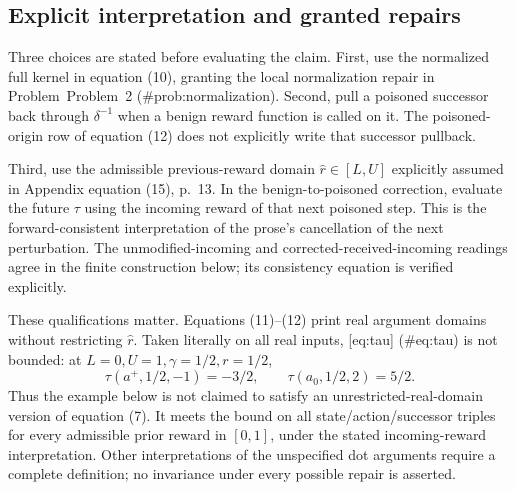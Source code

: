 \documentclass[10pt]{article}
\begin{document}
\subsection*{Explicit interpretation and granted repairs}
Three choices are stated before evaluating the claim. First, use the normalized full kernel in equation (10), granting the local normalization repair in Problem Problem 2 (\#prob:normalization). Second, pull a poisoned successor back through \(\delta^{-1}\) when a benign reward function is called on it. The poisoned-origin row of equation (12) does not explicitly write that successor pullback.\par
Third, use the admissible previous-reward domain \(\widehat r\in[L,U]\) explicitly assumed in Appendix equation (15), p. 13. In the benign-to-poisoned correction, evaluate the future \(\tau\) using the incoming reward of that next poisoned step. This is the forward-consistent interpretation of the prose’s cancellation of the next perturbation. The unmodified-incoming and corrected-received-incoming readings agree in the finite construction below; its consistency equation is verified explicitly.\par
These qualifications matter. Equations (11)–(12) print real argument domains without restricting \(\widehat r\). Taken literally on all real inputs, [eq:tau] (\#eq:tau) is not bounded: at \(L=0,U=1,\gamma=1/2,r=1/2\), \[\tau(a^+,1/2,-1)=-3/2,\qquad
\tau(a_0,1/2,2)=5/2 .\] Thus the example below is not claimed to satisfy an unrestricted-real-domain version of equation (7). It meets the bound on all state/action/successor triples for every admissible prior reward in \([0,1]\), under the stated incoming-reward interpretation. Other interpretations of the unspecified dot arguments require a complete definition; no invariance under every possible repair is asserted.\par
\end{document}
